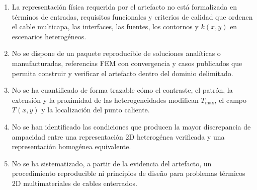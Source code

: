 \documentclass[11pt,a4paper,oneside]{report}
\newcommand{\Tmax}{T_{\max}}
\newcommand{\kx}{k(x,y)}
\begin{document}
\begin{enumerate}[label=PE\arabic*.]
  \item La representación física requerida por el artefacto no está formalizada en términos de entradas, requisitos funcionales y criterios de calidad que ordenen el cable multicapa, las interfaces, las fuentes, los contornos y $\kx$ en escenarios heterogéneos.
  \item No se dispone de un paquete reproducible de soluciones analíticas o manufacturadas, referencias FEM con convergencia y casos publicados que permita construir y verificar el artefacto dentro del dominio delimitado.
  \item No se ha cuantificado de forma trazable cómo el contraste, el patrón, la extensión y la proximidad de las heterogeneidades modifican $\Tmax$, el campo $T(x,y)$ y la localización del punto caliente.
  \item No se han identificado las condiciones que producen la mayor discrepancia de ampacidad entre una representación 2D heterogénea verificada y una representación homogénea equivalente.
  \item No se ha sistematizado, a partir de la evidencia del artefacto, un procedimiento reproducible ni principios de diseño para problemas térmicos 2D multimateriales de cables enterrados.
\end{enumerate}
\end{document}
